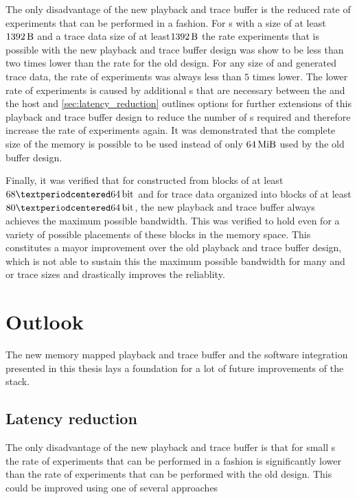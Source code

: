 The only disadvantage of the new playback and trace buffer is the reduced rate of experiments that can be performed in a \HWinTheLoop{} fashion.
For \PlaybackProgram{}s with a size of at least $\SI{1392}{\byte}$ and a trace data size of at least$\SI{1392}{\byte}$ the rate experiments that is possible with the new playback and trace buffer design was show to be less than two times lower than the rate for the old design. For any size of \PlaybackProgram{} and generated trace data, the rate of experiments was always less than $5$ times lower. The lower rate of experiments is caused by
additional \rtt{}s that are necessary between the \FPGA{} and the host and \autoref{sec:latency_reduction} outlines options for further extensions of this playback and trace buffer design to reduce the number of \rtt{}s required and therefore increase the rate of experiments again.
It was demonstrated that the complete size of the \DDR{} memory is possible to be used instead of only $\SI{64}{\mebi\byte}$ used by the old buffer design.

Finally, it was verified that for \PlaybackProgram{} constructed from blocks of at least $\num{68}·\PhyWordSize{}$ and for trace data organized into blocks of at least $\num{80}·\PhyWordSize{}$, the new playback and trace buffer always achieves the maximum possible bandwidth. This was verified to hold even for a variety of possible placements of these blocks in the \DDR{} memory space.
This constitutes a mayor improvement over the old playback and trace buffer design, which is not able to sustain this the maximum possible bandwidth for many \PlaybackProgram{} and or trace sizes and drastically improves the reliablity.

\section{Outlook}\label{sec:outlook}
The new memory mapped playback and trace buffer and the software integration presented in this thesis lays a foundation for a lot of future improvements of the \BSS{} stack.
\subsection{Latency reduction}\label{sec:latency_reduction}
The only disadvantage of the new playback and trace buffer is that for small \PlaybackProgram{}s the rate of experiments that can be performed in a \HWinTheLoop{} fashion is significantly lower than the rate of experiments that can be performed with the old design. This could be improved using one of several approaches
